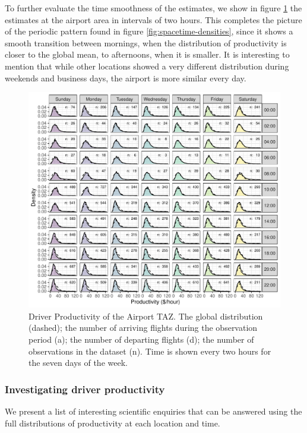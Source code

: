 \documentclass[a4paper, 11pt]{article}
\begin{document}
To further evaluate the time smoothness of the estimates, we show in figure \ref{fig:airport-densities} the estimates at the airport area in intervals of two hours. This completes the picture of the periodic pattern found in figure \ref{fig:spacetime-densities}, since it shows a smooth transition between mornings, when the distribution of productivity is closer to the global mean, to afternoons, when it is smaller. It is interesting to mention that while other locations showed a very different distribution during weekends and business days, the airport is more similar every day.



\begin{figure}[tb]
    \centering
    \includegraphics[width=0.98\linewidth]{img/densities_airport.pdf}
    \caption{Driver Productivity of the Airport TAZ. The global distribution (dashed); the number of arriving flights during the observation period (a); the number of departing flights (d); the number of observations in the dataset (n). Time is shown every two hours for the seven days of the week.}
    \label{fig:airport-densities}
\end{figure}


\subsubsection{Investigating driver productivity}

 We present a list of interesting scientific enquiries that can be answered using the full distributions of productivity at each location and time. 
 
\end{document}
